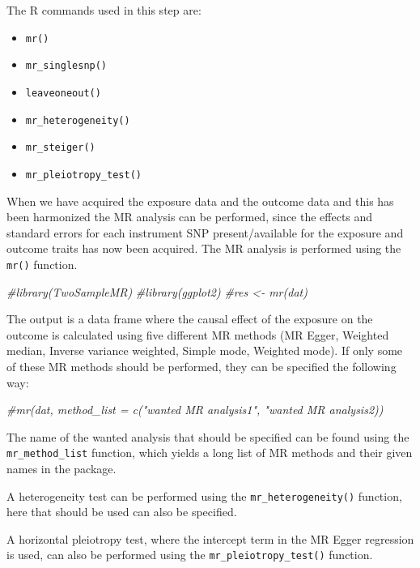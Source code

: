 \documentclass[
]{article}
\newenvironment{Shaded}{\begin{snugshade}}{\end{snugshade}}
\newcommand{\CommentTok}[1]{\textcolor[rgb]{0.56,0.35,0.01}{\textit{#1}}}
\providecommand{\tightlist}{%
  \setlength{\itemsep}{0pt}\setlength{\parskip}{0pt}}
\begin{document}
The R commands used in this step are:

\begin{itemize}
\tightlist
\item
  \texttt{mr()}
\item
  \texttt{mr\_singlesnp()}
\item
  \texttt{leaveoneout()}
\item
  \texttt{mr\_heterogeneity()}
\item
  \texttt{mr\_steiger()}
\item
  \texttt{mr\_pleiotropy\_test()}
\end{itemize}

When we have acquired the exposure data and the outcome data and this
has been harmonized the MR analysis can be performed, since the effects
and standard errors for each instrument SNP present/available for the
exposure and outcome traits has now been acquired. The MR analysis is
performed using the \texttt{mr()} function.

\begin{Shaded}
\begin{Highlighting}[]
\CommentTok{\#library(TwoSampleMR)}
\CommentTok{\#library(ggplot2)}
\CommentTok{\#res \textless{}{-} mr(dat)}
\end{Highlighting}
\end{Shaded}

The output is a data frame where the causal effect of the exposure on
the outcome is calculated using five different MR methods (MR Egger,
Weighted median, Inverse variance weighted, Simple mode, Weighted mode).
If only some of these MR methods should be performed, they can be
specified the following way:

\begin{Shaded}
\begin{Highlighting}[]
\CommentTok{\#mr(dat, method\_list = c("wanted MR analysis1", "wanted MR analysis2))}
\end{Highlighting}
\end{Shaded}

The name of the wanted analysis that should be specified can be found
using the \texttt{mr\_method\_list} function, which yields a long list
of MR methods and their given names in the package.

A heterogeneity test can be performed using the
\texttt{mr\_heterogeneity()} function, here that should be used can also
be specified.

A horizontal pleiotropy test, where the intercept term in the MR Egger
regression is used, can also be performed using the
\texttt{mr\_pleiotropy\_test()} function.
\end{document}
